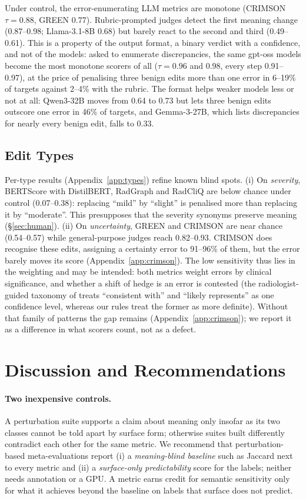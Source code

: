 \documentclass[11pt]{article}
\begin{document}
Under control, the error-enumerating LLM metrics are monotone (CRIMSON $\tau{=}0.88$, GREEN 0.77). Rubric-prompted judges detect the first meaning change (0.87--0.98; Llama-3.1-8B 0.68) but barely react to the second and third (0.49--0.61). This is a property of the output format, a binary verdict with a confidence, and not of the models: asked to enumerate discrepancies, the same gpt-oss models become the most monotone scorers of all ($\tau{=}0.96$ and $0.98$, every step 0.91--0.97), at the price of penalising three benign edits more than one error in 6--19\% of targets against 2--4\% with the rubric. The format helps weaker models less or not at all: Qwen3-32B moves from 0.64 to 0.73 but lets three benign edits outscore one error in 46\% of targets, and Gemma-3-27B, which lists discrepancies for nearly every benign edit, falls to 0.33.

\subsection{Edit Types}

Per-type results (Appendix~\ref{app:types}) refine known blind spots. (i) On \emph{severity}, BERTScore with DistilBERT, RadGraph and RadCliQ are below chance under control (0.07--0.38): replacing ``mild'' by ``slight'' is penalised more than replacing it by ``moderate''. This presupposes that the severity synonyms preserve meaning (\S\ref{sec:human}). (ii) On \emph{uncertainty}, GREEN and CRIMSON are near chance (0.54--0.57) while general-purpose judges reach 0.82--0.93. CRIMSON does recognise these edits, assigning a certainty error to 91--96\% of them, but the error barely moves its score (Appendix~\ref{app:crimson}). The low sensitivity thus lies in the weighting and may be intended: both metrics weight errors by clinical significance, and whether a shift of hedge is an error is contested (the radiologist-guided taxonomy of \citet{reref-2026} treats ``consistent with'' and ``likely represents'' as one confidence level, whereas our rules treat the former as more definite). Without that family of patterns the gap remains (Appendix~\ref{app:crimson}); we report it as a difference in what scorers count, not as a defect.

\section{Discussion and Recommendations}

\paragraph{Two inexpensive controls.}
A perturbation suite supports a claim about meaning only insofar as its two classes cannot be told apart by surface form; otherwise suites built differently contradict each other for the same metric. We recommend that perturbation-based meta-evaluations report (i) a \emph{meaning-blind baseline} such as Jaccard next to every metric and (ii) a \emph{surface-only predictability} score for the labels; neither needs annotation or a GPU. A metric earns credit for semantic sensitivity only for what it achieves beyond the baseline on labels that surface does not predict.
\end{document}
